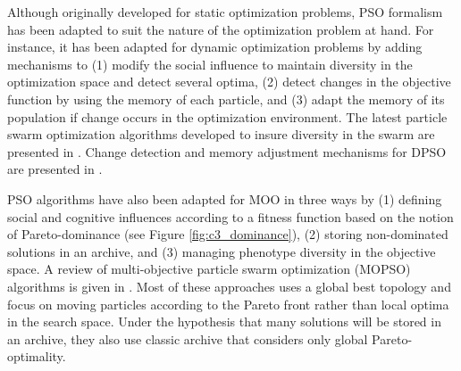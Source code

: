 Although originally developed for static optimization problems, PSO formalism has been adapted to suit the nature of the optimization problem at hand.
For instance, it has been adapted for dynamic optimization problems by adding mechanisms to (1) modify the social influence to maintain diversity in the optimization space and detect several optima, (2) detect changes in the objective function by using the memory of each particle, and (3) adapt the memory of its population if change occurs in the optimization environment.
The latest particle swarm optimization algorithms developed to insure diversity in the swarm are presented in \cite{du08, li06, nickabadi08_2, ozcan07}.
Change detection and memory adjustment mechanisms for DPSO are presented in \cite{blackwell04, carlisle02, hu02, wang07}.

PSO algorithms have also been adapted for MOO in three ways by (1) defining social and cognitive influences according to a fitness function based on the notion of Pareto-dominance (see Figure \ref{fig:c3_dominance}), (2) storing non-dominated solutions in an archive, and (3) managing phenotype diversity in the objective space.
A review of multi-objective particle swarm optimization (MOPSO) algorithms is given in \cite{reyes06}.
Most of these approaches uses a global best topology and focus on moving particles according to the Pareto front rather than local optima in the search space.
Under the hypothesis that many solutions will be stored in an archive, they also use classic archive that considers only global Pareto-optimality.

